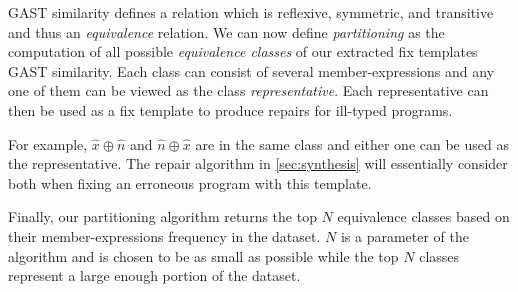 GAST similarity defines a relation which is reflexive, symmetric, and transitive
and thus an \emph{equivalence} relation. We can now define \emph{partitioning}
as the computation of all possible \emph{equivalence classes} of our extracted
fix templates \wrt GAST similarity. Each class can consist of several
member-expressions and any one of them can be viewed as the class
\emph{representative}. Each representative can then be used as a fix template to
produce repairs for ill-typed programs.

For example, $\hat{x} \oplus \hat{n}$ and $\hat{n} \oplus \hat{x}$ are in the
same class and either one can be used as the representative. The repair
algorithm in \autoref{sec:synthesis} will essentially consider both when fixing
an erroneous program with this template.

Finally, our partitioning algorithm returns the top $N$ equivalence classes
based on their member-expressions frequency in the dataset. $N$ is a parameter
of the algorithm and is chosen to be as small as possible while the top $N$
classes represent a large enough portion of the dataset.
